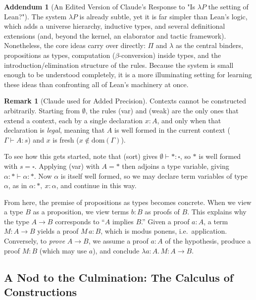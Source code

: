 \documentclass{article}
\theoremstyle{definition}
\newtheorem{remark} [theorem] {Remark}
\newtheorem{addendum}{Addendum}
\newcommand{\1}{\mathbb{1}}
\newcommand{\0}{\mathbb{0}}
\begin{document}
\begin{addendum}[An Edited Version of Claude's Response to "Is $\lambda P$ the setting of Lean?"]
    The system $\lambda P$ is already subtle, yet it is far simpler than Lean's logic, which adds a universe hierarchy, inductive types, and several definitional extensions (and, beyond the kernel, an elaborator and tactic framework). Nonetheless, the core ideas carry over directly: $\Pi$ and $\lambda$ as the central binders, propositions as types, computation ($\beta$-conversion) inside types, and the introduction/elimination structure of the rules. Because the system is small enough to be understood completely, it is a more illuminating setting for learning these ideas than confronting all of Lean's machinery at once.
\end{addendum}

\begin{remark}[Claude used for Added Precision]
Contexts cannot be constructed arbitrarily. Starting from $\emptyset$, the rules (var) and (weak) are the only ones that extend a context, each by a single declaration $x : A$, and only when that declaration is \emph{legal}, meaning that $A$ is well formed in the current context ($\Gamma \vdash A : s$) and $x$ is fresh ($x \notin \mathrm{dom}(\Gamma)$).

To see how this gets started, note that (sort) gives $\emptyset \vdash * : \square$, so $*$ is well formed with $s = \square$. Applying (var) with $A = *$ then adjoins a type variable, giving $\alpha : * \vdash \alpha : *$. Now $\alpha$ is itself well formed, so we may declare term variables of type $\alpha$, as in
$\alpha : *,\ x : \alpha$, and continue in this way.

From here, the premise of propositions as types becomes concrete. When we view a type $B$ as a proposition, we view terms $b : B$ as proofs of $B$. This explains why the type $A \to B$ corresponds to ``$A$ implies $B$.'' Given a proof $a : A$, a term $M : A \to B$ yields a proof $M\,a : B$, which is modus ponens, i.e.\ application. Conversely, to \emph{prove} $A \to B$, we assume a proof $a : A$ of the hypothesis, produce a proof $M : B$ (which may use $a$), and conclude $\lambda a{:}A.\,M : A \to B$.
\end{remark}

\subsection{A Nod to the Culmination: The Calculus of Constructions}
\end{document}
